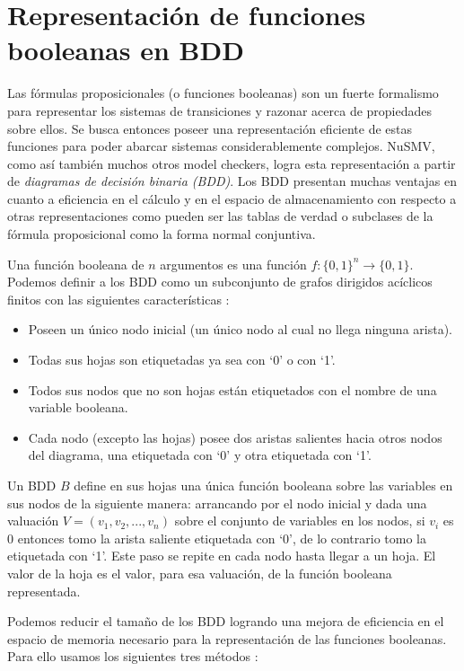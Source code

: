 \documentclass[titlepage, 12pt]{book}
\begin{document}
\section{Representaci\'on de funciones booleanas en BDD}
\label{boolBDD}

Las f\'ormulas proposicionales (o funciones booleanas) son un fuerte formalismo para representar los sistemas de transiciones y razonar acerca de propiedades sobre ellos. Se busca entonces poseer una representaci\'on eficiente de estas funciones para poder abarcar sistemas considerablemente complejos. NuSMV, como as\'i tambi\'en muchos otros model checkers, logra esta representaci\'on a partir de \textit{diagramas de decisi\'on binaria (BDD)}. Los BDD presentan muchas ventajas en cuanto a eficiencia en el c\'alculo y en el espacio de almacenamiento con respecto a otras representaciones como pueden ser las tablas de verdad o subclases de la f\'ormula proposicional como la forma normal conjuntiva.

Una funci\'on booleana de $n$ argumentos es una funci\'on $f : \{0,1\}^n \to \{0,1\}$. Podemos definir a los BDD como un subconjunto de grafos dirigidos ac\'iclicos finitos con las siguientes caracter\'isticas \cite{Huth}:

\begin{itemize}
\item Poseen un \'unico nodo inicial (un \'unico nodo al cual no llega ninguna arista).
\item Todas sus hojas son etiquetadas ya sea con `0' o con `1'.
\item Todos sus nodos que no son hojas est\'an etiquetados con el nombre de una variable booleana.
\item Cada nodo (excepto las hojas) posee dos aristas salientes hacia otros nodos del diagrama, una etiquetada con `0' y otra etiquetada con `1'.
\end{itemize}

Un BDD $B$ define en sus hojas una \'unica funci\'on booleana sobre las variables en sus nodos de la siguiente manera: arrancando por el nodo inicial y dada una valuaci\'on $V=(v_1,v_2,...,v_n)$ sobre el conjunto de variables en los nodos, si $v_i$ es $0$ entonces tomo la arista saliente etiquetada con `0', de lo contrario tomo la etiquetada con `1'. Este paso se repite en cada nodo hasta llegar a un hoja. El valor de la hoja es el valor, para esa valuaci\'on, de la funci\'on booleana representada.

Podemos reducir el tama\~no de los BDD logrando una mejora de eficiencia en el espacio de memoria necesario para la representaci\'on de las funciones booleanas. Para ello usamos los siguientes tres m\'etodos \cite{Huth}:
\end{document}
